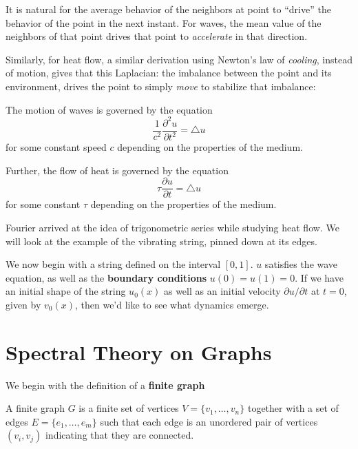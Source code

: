 \documentclass[../master.tex]{subfiles}
\begin{document}
	It is natural for the average behavior of the neighbors at point to ``drive'' the behavior of the point in the next instant. For waves, the mean value of the neighbors of that point drives that point to \emph{accelerate} in that direction. 
	
	Similarly, for heat flow, a similar derivation using Newton's law of \emph{cooling}, instead of motion, gives that this Laplacian: the imbalance between the point and its environment, drives the point to simply \emph{move} to stabilize that imbalance:
	\begin{concept}
		The motion of waves is governed by the equation
		\begin{equation*}
			\frac{1}{c^2} \frac{\partial^2 u}{\partial t^2} = \triangle u
		\end{equation*}
		for some constant speed $c$ depending on the properties of the medium.
		
		Further, the flow of heat is governed by the equation
		\begin{equation*}
			\tau \frac{\partial u}{\partial t} = \triangle u
		\end{equation*}
		for some constant $\tau$ depending on the properties of the medium. 
	\end{concept}
	
	Fourier arrived at the idea of trigonometric series while studying heat flow. We will look at the example of the vibrating string, pinned down at its edges. 
	
	We now begin with a string defined on the interval $[0,1]$. $u$ satisfies the wave equation, as well as the \textbf{boundary conditions} $u(0)= u(1)= 0$. If we have an initial shape of the string $u_0(x)$ as well as an initial velocity $\partial u/\partial t$ at $t=0$, given by $v_0(x)$, then we'd like to see what dynamics emerge. 
	
	


\section{Spectral Theory on Graphs} %
\label{sec:spectral_theory_on_graphs}

	We begin with the definition of a \textbf{finite graph}
	\begin{defn}
		A finite graph $G$ is a finite set of vertices $V = \{v_1, \dots, v_n\}$ together with a set of edges $E = \{e_1, \dots, e_m\}$ such that each edge is an unordered pair of vertices $(v_i, v_j)$ indicating that they are connected.
	\end{defn}
	
\end{document}
